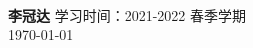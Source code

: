 \documentclass[A4paper]{ctexart}
\date{\today}
\theoremstyle{definition}
\theoremstyle{plain}
\theoremstyle{remark}
\theoremstyle{plain}
\theoremstyle{plain}
\theoremstyle{plain}
\theoremstyle{plain}
\begin{document}
\begin{titlepage}
    \begin{center}
        \vspace*{3cm}
        \Huge
        \textbf{ }\\                     %
        \vspace{1.5cm}
        \Large
        \textbf{李冠达}                   %
        \vfill
        学习时间：2021-2022 春季学期 \\       %
        \vspace{1cm}
        \Large
        \today                              %
    \end{center}
\end{titlepage}
\end{document}
